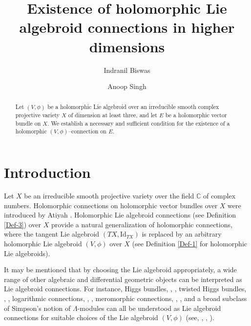 \documentclass[12pt,reqno]{amsart}
\numberwithin{equation}{section}
\theoremstyle{definition}
\begin{document}
\baselineskip=15pt

\title[Holomorphic Lie algebroid connections in higher dimensions]{Existence of holomorphic Lie algebroid 
connections in higher dimensions}

\author[I. Biswas]{Indranil Biswas}

\address{Department of Mathematics, Shiv Nadar University, NH91, Tehsil Dadri,
Greater Noida, Uttar Pradesh 201314, India}


\author[A. Singh]{Anoop Singh}

\address{Department of Mathematical Sciences, Indian Institute of Technology (BHU), Varanasi 
221005, India}




\date{}

\begin{abstract}
Let $(V,  \phi)$ be a holomorphic Lie algebroid over an irreducible smooth complex projective variety
$X$ of dimension at least three, and let $E$ be a holomorphic vector bundle on $X$. We establish a
necessary and sufficient condition for the existence of a holomorphic $(V, \phi)$--connection on $E$.
\end{abstract}

\maketitle

\section{Introduction}

Let $X$ be an irreducible smooth projective variety over the field $\mathbb{C}$ of complex numbers.
Holomorphic connections on holomorphic vector bundles over $X$ were introduced by
Atiyah \cite{At}. Holomorphic Lie algebroid connections (see Definition \ref{Def-3}) over $X$
provide a natural generalization of holomorphic connections, where
the tangent Lie algebroid $(TX,  \mathrm{Id}_{TX})$ is replaced by
an arbitrary holomorphic Lie algebroid $(V,  \phi)$ over $X$ (see Definition \ref{Def-1} for
holomorphic Lie algebroids).

It may be mentioned that by choosing the Lie algebroid appropriately, a wide range of other 
algebraic and differential geometric objects can be interpreted as Lie algebroid 
connections. For instance, Higgs bundles, \cite{Hi}, \cite{Si1}, twisted Higgs bundles, 
\cite{Ni1}, \cite{GGPN}, logarithmic connections, \cite{De}, \cite{Ni2}, meromorphic connections, 
\cite{Bo}, \cite{BS2}, and a broad subclass of Simpson's notion of $\Lambda$-modules
can all be understood as Lie algebroid connections for suitable choices of the Lie 
algebroid $(V,  \phi)$ (see, \cite{Si2}, \cite{To2}, \cite{AO}).
\end{document}
